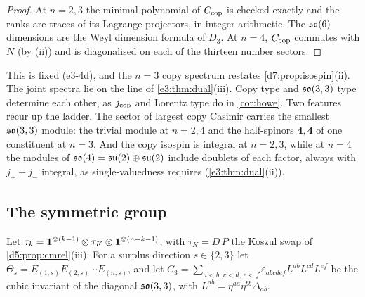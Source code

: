 \begin{proof}
At $n=2,3$ the minimal polynomial of $C_{\rm cop}$ is checked exactly and the ranks are traces of its Lagrange projectors, in integer
arithmetic. The $\mathfrak{so}(6)$ dimensions are the Weyl dimension formula of $D_3$. At $n=4$, $C_{\rm cop}$ commutes with $N$ (by (ii)) and is
diagonalised on each of the thirteen number sectors.
\end{proof}

This is fixed (e3-4d), and the $n=3$ copy spectrum restates \cref{d7:prop:isospin}(ii). The joint spectra lie on the line of
\cref{e3:thm:dual}(iii). Copy type and $\mathfrak{so}(3,3)$ type determine each other, as $j_{\rm cop}$ and Lorentz type do in \cref{cor:howe}. Two features recur up the ladder. The sector of largest copy Casimir carries the smallest $\mathfrak{so}(3,3)$ module: the trivial module at
$n=2,4$ and the half-spinors $\mathbf4,\bar{\mathbf4}$ of one constituent at $n=3$. And the copy isospin is integral at $n=2,3$, while at $n=4$ the
modules of $\mathfrak{so}(4)=\mathfrak{su}(2)\oplus\mathfrak{su}(2)$ include doublets of each factor, always with $j_++j_-$ integral, as single-valuedness requires (\cref{e3:thm:dual}(ii)).

\subsection{The symmetric group}
\label{e3:sec:sym}

Let $\tau_k=\mathbf 1^{\otimes(k-1)}\otimes\tau_K\otimes\mathbf 1^{\otimes(n-k-1)}$, with $\tau_K=D\,P$ the Koszul swap of \cref{d5:prop:cmrel}(iii). For a
surplus direction $s\in\{2,3\}$ let $\Theta_s=E_{(1,s)}\allowbreak E_{(2,s)}\cdots E_{(n,s)}$, and let $C_3=\sum_{a<b,\,c<d,\,e<f}\allowbreak\varepsilon_{abcdef}L^{ab}L^{cd}L^{ef}$ be the cubic invariant of
the diagonal $\mathfrak{so}(3,3)$, with $L^{ab}=\eta^{aa}\eta^{bb}\Delta_{ab}$.

